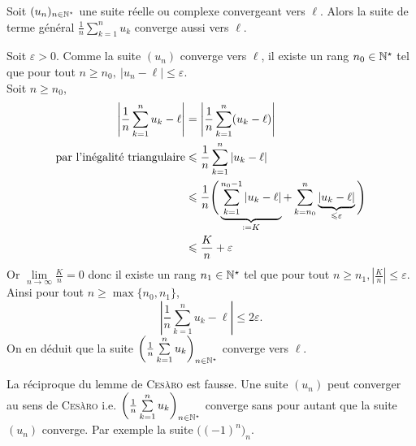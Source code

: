 \begin{lemme}
    Soit $(u_n)_{n \in \mathbb{N}^\star}$ une suite réelle ou complexe convergeant vers $\ell$.
    Alors la suite de terme général $\frac{1}{n} \sum\limits_{k=1}^{n} u_k$ converge aussi vers $\ell$.
\end{lemme}

\begin{preuve}
    Soit $\varepsilon > 0$. Comme la suite $(u_n)$ converge vers $\ell$, il existe un rang $n_0 \in \mathbb{N}^\star$ tel que pour tout $n \geqslant n_0,\ |u_n - \ell| \leqslant \varepsilon$. \\
    Soit $n \geqslant n_0$,
    \begin{align*}
        \left| \frac{1}{n} \sum_{k=1}^n u_k - \ell \right| &= \left| \frac{1}{n} \sum_{k=1}^n (u_k - \ell) \right| \\
        \text{par l'inégalité triangulaire} &\leqslant \frac{1}{n} \sum_{k=1}^n |u_k - \ell| \\
        &\leqslant \frac{1}{n} \Bigg( \underbrace{\sum_{k=1}^{n_0-1} |u_k - \ell|}_{\defeq K} + \sum_{k=n_0}^n \underbrace{|u_k - \ell|}_{\leqslant \varepsilon} \Bigg) \\
        &\leqslant \frac{K}{n} + \varepsilon
    \end{align*}
    Or $\lim\limits_{n \to \infty} \frac{K}{n} = 0$ donc il existe un rang $n_1 \in \mathbb{N}^\star$ tel que pour tout $n \geqslant n_1, \left| \frac{K}{n} \right| \leqslant \varepsilon$. \\
    Ainsi pour tout $n \geqslant \max \{ n_0, n_1 \}$, 
    $$\left| \frac{1}{n} \sum_{k=1}^n u_k - \ell \right| \leqslant 2 \varepsilon.$$
    On en déduit que la suite $\bigg( \frac{1}{n} \sum\limits_{k=1}^{n} u_k \bigg)_{n \in \mathbb{N}^\star}$ converge vers $\ell$.
\end{preuve}

\begin{remarque}
    La réciproque du lemme de \textsc{Cesàro} est fausse. Une suite $(u_n)$ peut converger au sens de \textsc{Cesàro} i.e. $\bigg( \frac{1}{n} \sum\limits_{k=1}^{n} u_k \bigg)_{n \in \mathbb{N}^\star}$ converge sans pour autant que la suite $(u_n)$ converge. Par exemple la suite $\big((-1)^n\big)_n$.
\end{remarque}